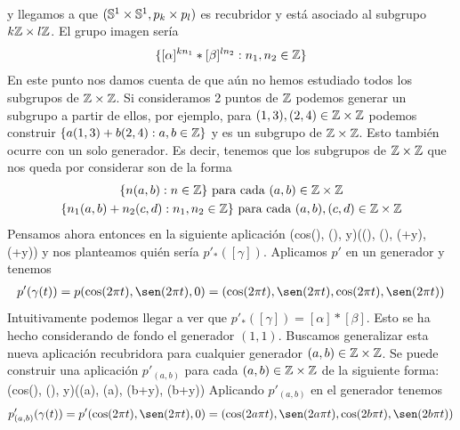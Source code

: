 \begin{ejemplo}
\begin{enumerate}
\begin{gather*}
        \end{gather*}
        y llegamos a que $(\mathbb{S}^1 \times \mathbb{S}^1, p_k\times p_l)$ es recubridor y está asociado al subgrupo $k\mathbb{Z}\times l\mathbb{Z}$. El grupo imagen sería
        \begin{gather*}
            \{[\alpha]^{kn_1}\ast [\beta]^{ln_2} : n_1,n_2\in \mathbb{Z}\}
        \end{gather*}
        En este punto nos damos cuenta de que aún no hemos estudiado todos los subgrupos de $\mathbb{Z}\times \mathbb{Z}$. Si consideramos 2 puntos de $\mathbb{Z}$ podemos generar un subgrupo a partir de ellos, por ejemplo, para $(1,3), (2,4)\in \mathbb{Z}\times \mathbb{Z}$ podemos construir $\{a(1,3)+b(2,4) : a,b\in \mathbb{Z}\}$ y es un subgrupo de $\mathbb{Z}\times \mathbb{Z}$. Esto también ocurre con un solo generador. Es decir, tenemos que los subgrupos de $\mathbb{Z}\times \mathbb{Z}$ que nos queda por considerar son de la forma
        \begin{gather*}
            \{n(a,b) : n\in \mathbb{Z}\} \text{ para cada } (a,b)\in \mathbb{Z}\times \mathbb{Z}\\
            \{n_1(a,b) + n_2(c,d) : n_1,n_2\in \mathbb{Z}\} \text{ para cada } (a,b), (c,d)\in \mathbb{Z}\times \mathbb{Z}
        \end{gather*}
        Pensamos ahora entonces en la siguiente aplicación
        {(cos(\theta), \sen(\theta), y)}{(\cos(\theta), \sen(\theta), \cos(\theta+y), \sen(\theta+y))}
        y nos planteamos quién sería $p'_*([\gamma])$. Aplicamos $p'$ en un generador y tenemos
        \begin{gather*}
            p'(\gamma(t)) = p(\cos(2\pi t), \sen(2\pi t), 0) = (\cos(2\pi t), \sen(2\pi t), \cos(2\pi t), \sen(2\pi t))
        \end{gather*}
        Intuitivamente podemos llegar a ver que $p'_*([\gamma]) = [\alpha] \ast [\beta]$.
        Esto se ha hecho considerando de fondo el generador $(1,1)$. Buscamos generalizar esta nueva aplicación recubridora para cualquier generador $(a,b)\in \mathbb{Z}\times \mathbb{Z}$. Se puede construir una aplicación $p'_{(a,b)}$ para cada $(a,b)\in \mathbb{Z}\times \mathbb{Z}$ de la siguiente forma:
        {(cos(\theta), \sen(\theta), y)}{(\cos(a\theta), \sen(a\theta), \cos(b\theta+y), \sen(b\theta+y))}
        Aplicando $p'_{(a,b)}$ en el generador tenemos
        \begin{gather*}
            p'_{(a,b)}(\gamma(t)) = p'(\cos(2\pi t), \sen(2\pi t), 0) = (\cos(2a\pi t), \sen(2a\pi t), \cos(2b\pi t), \sen(2b\pi t))
        \end{gather*}


\end{enumerate}
\end{ejemplo}
